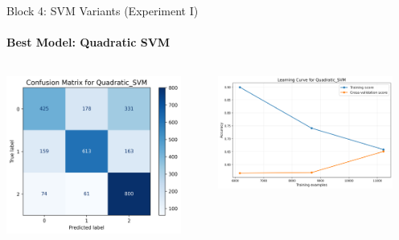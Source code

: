 \documentclass[9pt]{beamer}
\begin{document}
    \begin{frame}{Block 4: SVM Variants (Experiment I)}
    \framesubtitle{Best Model: Quadratic SVM}
    \begin{columns}
        \begin{column}{0.5\textwidth}
            \centering
            \includegraphics[width=0.9\textwidth]{code/ResultsMainAugZip/plots/Block4_SVM_Variants_Experiment_I/confusion_matrix_Quadratic_SVM.png}
        \end{column}
        \begin{column}{0.5\textwidth}
            \centering
            \includegraphics[width=0.9\textwidth]{code/ResultsMainAugZip/plots/Block4_SVM_Variants_Experiment_I/learning_curve_Quadratic_SVM.png}
        \end{column}
    \end{columns}
    \end{frame}
    
\end{document}
